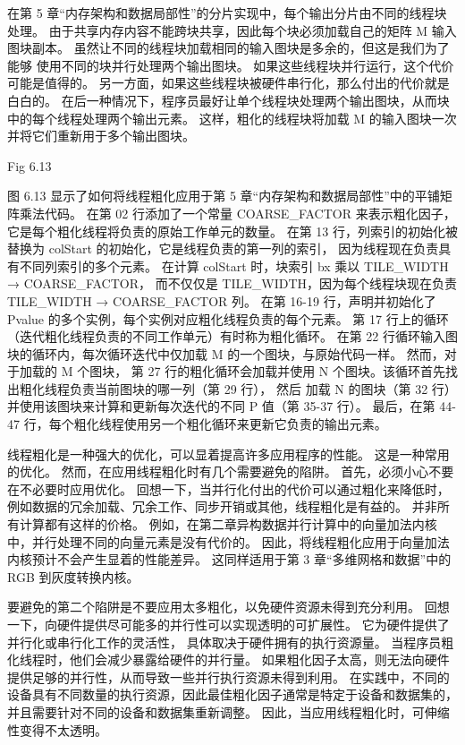 在第 5 章“内存架构和数据局部性”的分片实现中，每个输出分片由不同的线程块处理。 
由于共享内存内容不能跨块共享，因此每个块必须加载自己的矩阵 M 输入图块副本。
虽然让不同的线程块加载相同的输入图块是多余的，但这是我们为了能够 使用不同的块并行处理两个输出图块。 
如果这些线程块并行运行，这个代价可能是值得的。 另一方面，如果这些线程块被硬件串行化，那么付出的代价就是白白的。 
在后一种情况下，程序员最好让单个线程块处理两个输出图块，从而块中的每个线程处理两个输出元素。 
这样，粗化的线程块将加载 M 的输入图块一次并将它们重新用于多个输出图块。

{\color{red} Fig 6.13}

图 6.13 显示了如何将线程粗化应用于第 5 章“内存架构和数据局部性”中的平铺矩阵乘法代码。 
在第 02 行添加了一个常量 COARSE\_FACTOR 来表示粗化因子，它是每个粗化线程将负责的原始工作单元的数量。 
在第 13 行，列索引的初始化被替换为 colStart 的初始化，它是线程负责的第一列的索引，
因为线程现在负责具有不同列索引的多个元素。 在计算 colStart 时，块索引 bx 乘以 TILE\_WIDTH → COARSE\_FACTOR，
而不仅仅是 TILE\_WIDTH，因为每个线程块现在负责 TILE\_WIDTH → COARSE\_FACTOR 列。 
在第 16-19 行，声明并初始化了 Pvalue 的多个实例，每个实例对应粗化线程负责的每个元素。 
第 17 行上的循环（迭代粗化线程负责的不同工作单元）有时称为粗化循环。 
在第 22 行循环输入图块的循环内，每次循环迭代中仅加载 M 的一个图块，与原始代码一样。 然而，对于加载的 M 个图块，
第 27 行的粗化循环会加载并使用 N 个图块。该循环首先找出粗化线程负责当前图块的哪一列（第 29 行），
然后 加载 N 的图块（第 32 行）并使用该图块来计算和更新每次迭代的不同 P 值（第 35-37 行）。 
最后，在第 44-47 行，每个粗化线程使用另一个粗化循环来更新它负责的输出元素。

线程粗化是一种强大的优化，可以显着提高许多应用程序的性能。 这是一种常用的优化。 
然而，在应用线程粗化时有几个需要避免的陷阱。 首先，必须小心不要在不必要时应用优化。 
回想一下，当并行化付出的代价可以通过粗化来降低时，例如数据的冗余加载、冗余工作、同步开销或其他，线程粗化是有益的。 
并非所有计算都有这样的价格。 例如，在第二章异构数据并行计算中的向量加法内核中，并行处理不同的向量元素是没有代价的。 
因此，将线程粗化应用于向量加法内核预计不会产生显着的性能差异。 
这同样适用于第 3 章“多维网格和数据”中的 RGB 到灰度转换内核。

要避免的第二个陷阱是不要应用太多粗化，以免硬件资源未得到充分利用。 
回想一下，向硬件提供尽可能多的并行性可以实现透明的可扩展性。 它为硬件提供了并行化或串行化工作的灵活性，
具体取决于硬件拥有的执行资源量。 当程序员粗化线程时，他们会减少暴露给硬件的并行量。 
如果粗化因子太高，则无法向硬件提供足够的并行性，从而导致一些并行执行资源未得到利用。 
在实践中，不同的设备具有不同数量的执行资源，因此最佳粗化因子通常是特定于设备和数据集的，
并且需要针对不同的设备和数据集重新调整。 因此，当应用线程粗化时，可伸缩性变得不太透明。

